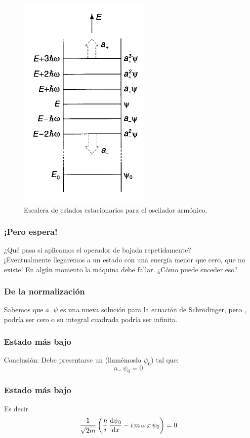 \documentclass[12pt]{beamer}
\begin{document}
\begin{frame}[plain]
\begin{figure}[H]
    \centering
    \includegraphics[scale=0.6]{Imagenes/Operadores_escalera.png}
    \caption{Escalera de estados estacionarios para el oscilador armónico.}
    \label{fig:figura_002}
\end{figure}
\end{frame}
\begin{frame}
\frametitle{¡Pero espera!}
¿Qué pasa si aplicamos el operador de bajada repetidamente? 
\\
\bigskip
\pause
¡Eventualmente llegaremos a un estado con una energía menor que cero, que no existe! \pause En algún momento la máquina debe fallar. \pause ¿Cómo puede suceder eso? 
\end{frame}
\begin{frame}
\frametitle{De la normalización}
Sabemos que $a_{-} \psi$ es una nueva solución para la ecuación de Schrödinger, \pause pero , \pause podría ser cero o su integral cuadrada podría ser infinita.
\end{frame}
\begin{frame}
\frametitle{Estado más bajo}
Conclusión: \pause Debe presentarse un  (llamémoslo $\psi_{0}$) tal que:
\pause
\begin{equation}
a_{-} \, \psi_{0} = 0
\label{eq:ecuacion_02_047}
\end{equation}
\end{frame}
\begin{frame}
\frametitle{Estado más bajo}
Es decir
\begin{align*}
\dfrac{1}{\sqrt{2 m}} \left( \dfrac{\hbar}{i} \, \dv{\psi_{0}}{x} - i \, m \, \omega \, x \, \psi_{0} \right) = 0
\end{align*}
\end{frame}
\end{document}
